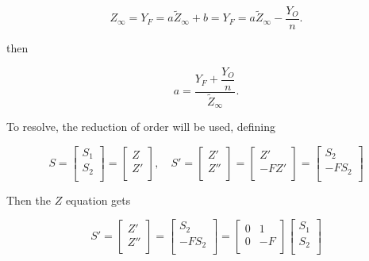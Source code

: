 \begin{equation}
Z_\infty
=
Y_F=a\tilde{Z}_\infty +b 
=
Y_F=a\tilde{Z}_\infty
-
\frac{Y_O}{n} .
\end{equation}

then

\begin{equation}
a
=
\dfrac{Y_F+\dfrac{Y_O}{n}}{\tilde{Z}_\infty}
.
\end{equation}

To resolve, the reduction of 
order will  be used, defining 

\begin{equation}
    S=
\begin{bmatrix}
   S_1\\ 
   S_2\\
\end{bmatrix}
=
\begin{bmatrix}
   Z\\ 
   Z'\\
\end{bmatrix}
,
\quad
S'=
\begin{bmatrix}
   Z'\\ 
   Z''\\
\end{bmatrix}
=
\begin{bmatrix}
   Z'\\ 
   -FZ'\\
\end{bmatrix}
=
\begin{bmatrix}
S_2\\
-FS_2\\
\end{bmatrix}
\end{equation}

Then the $Z$ equation gets  

\begin{equation}
S'=
\begin{bmatrix}
   Z'\\ 
   Z''\\
\end{bmatrix}
=
\begin{bmatrix}
S_2\\
-FS_2\\
\end{bmatrix}
=
\begin{bmatrix}
0    & 1 \\
0    & -F \\
\end{bmatrix}
\begin{bmatrix}
   S_1\\ 
   S_2\\
\end{bmatrix}
\end{equation}


